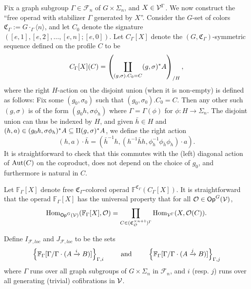 \documentclass[a4paper,10pt
,draft
]{article}%
\renewcommand{\F}{\mathcal F}
\renewcommand{\1}{\eta}%
\begin{document}
Fix a graph subgroup $\Gamma \in \F_n$ of $G \times \Sigma_n$, and $X \in \mathcal V^\Gamma$.
We now construct the ``free operad with stabilizer $\Gamma$ generated by $X$''.
Consider the $G$-set of colors $\mathfrak C_\Gamma := G \cdot_\Gamma \langle n \rangle$,
and let $C_0$ denote the signature $([e,1],[e,2],\dots,[e,n];[e,0])$.
Let $C_\Gamma[X]$ denote the $(G,\mathfrak C_\Gamma)$-symmetric sequence defined on the profile $C$ to be
\begin{equation}
      C_\Gamma[X](C) =
      \left(\coprod_{(g,\sigma).C_0 = C} (g,\sigma)^{\**}A \right)_{/ H},
\end{equation}
where the right $H$-action on the disjoint union (when it is non-empty) is defined as follows:
Fix some $(g_0, \sigma_0)$ such that $(g_0,\sigma_0).C_0 = C$.
Then any other such $(g,\sigma)$ is of the form $(g_0 h, \sigma \phi_h)$ where $\Gamma = \Gamma(\phi)$ for $\phi: H \to \Sigma_n$.
The disjoint union can thus be indexed by $H$,
and given $\bar h \in H$ and $(h,a) \in (g_0h,\sigma\phi_h)^{\**}A \subseteq \amalg (g,\sigma)^{\**}A$, we define the right action
\[
      (h,a) \cdot \bar h = \left( \bar h^{-1} h, \left(h^{-1} \bar h h, \phi_h^{-1} \phi_{\bar h} \phi_h\right) \cdot a \right).
\]
It is straightforward to check that this commutes with the (left) diagonal action of $\operatorname{Aut}(C)$ on the coproduct,
does not depend on the choice of $g_0$, 
and furthermore is natural in $C$.

Let $\mathbb F_\Gamma[X]$ denote free $\mathfrak C_\Gamma$-colored operad $\mathbb F^{\mathfrak C_\Gamma} (C_\Gamma[X])$.
It is straightforward that the operad $\mathbb F_\Gamma[X]$ has the universal property that for all $\mathcal{O} \in \mathsf{Op}^G(\mathcal V)$,
\begin{equation}
      \operatorname{Hom}_{\mathsf{Op}^G(\mathcal V)}(\mathbb F_\Gamma[X], \mathcal{O}) = \mathop\prod\limits_{C \in (\mathfrak C_{\mathcal{O}}^{\times n+1})^\Gamma}\operatorname{Hom}_{\mathcal V^\Gamma}(X, \mathcal{O}(C)).
\end{equation}

Define $I_{\F,loc}$ and $J_{\F, loc}$ to be the sets
\begin{align*}
  \left\{\mathbb F_\Gamma[\Gamma/\Gamma \cdot (A \xrightarrow{i} B)]\right\}_{\Gamma, i}
  \qquad \mbox{ and } \qquad
  \left\{\mathbb F_\Gamma[\Gamma/\Gamma \cdot (A \xrightarrow{j} B)]\right\}_{\Gamma,j}
\end{align*}
where $\Gamma$ runs over all graph subgroups of $G \times \Sigma_n$ in $\F_n$,
and $i$ (resp. $j$) runs over all generating (trivial) cofibrations in $\mathcal V$.
\end{document}
